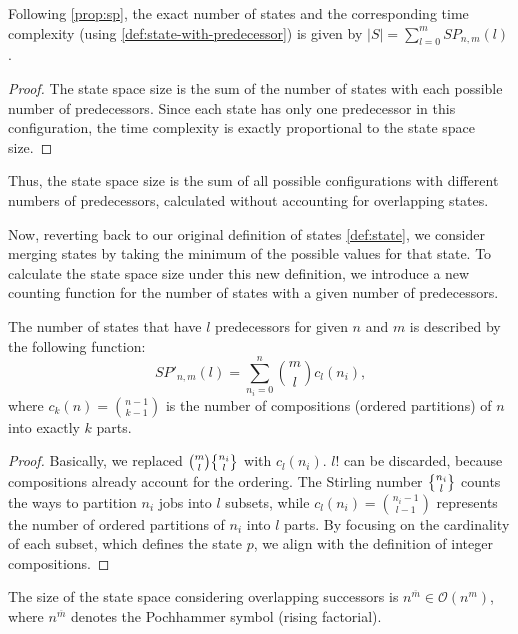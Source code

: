 \begin{corollary} \label{cor:ss-without-overlap}
    Following \autoref{prop:sp}, the exact number of states and the corresponding time complexity (using \autoref{def:state-with-predecessor}) is given by $|S| = \sum_{l=0}^m SP_{n,m}(l)$.
\end{corollary}

\begin{proof}
    The state space size is the sum of the number of states with each possible number of predecessors. Since each state has only one predecessor in this configuration, the time complexity is exactly proportional to the state space size.
\end{proof}

Thus, the state space size is the sum of all possible configurations with different numbers of predecessors, calculated without accounting for overlapping states.

Now, reverting back to our original definition of states \ref{def:state}, we consider merging states by taking the minimum of the possible values for that state. To calculate the state space size under this new definition, we introduce a new counting function for the number of states with a given number of predecessors.

\begin{proposition} \label{prop:sp'}
    The number of states that have $l$ predecessors for given $n$ and $m$ is described by the following function:
    \[
        SP'_{n,m}(l) = \sum_{n_i=0}^{n} \binom{m}{l} c_l(n_i)\text{,}
    \]
    where $c_k(n) = \binom{n - 1}{k - 1}$ is the number of compositions (ordered partitions) of $n$ into exactly $k$ parts.
\end{proposition}

\begin{proof}
    Basically, we replaced $\binom{m}{l} \stirlingS{n_i}{l}$ with $c_l(n_i)$. $l!$ can be discarded, because compositions already account for the ordering. The Stirling number $\stirlingS{n_i}{l}$ counts the ways to partition $n_i$ jobs into $l$ subsets, while $c_l(n_i) = \binom{n_i - 1}{l - 1}$ represents the number of ordered partitions of $n_i$ into $l$ parts. By focusing on the cardinality of each subset, which defines the state $p$, we align with the definition of integer compositions.
\end{proof}

\begin{lemma}
    The size of the state space considering overlapping successors is $n^{\overline{m}} \in \mathcal{O}\left( n^m \right)$, where $n^{\overline{m}}$ denotes the Pochhammer symbol (rising factorial).
\end{lemma}

